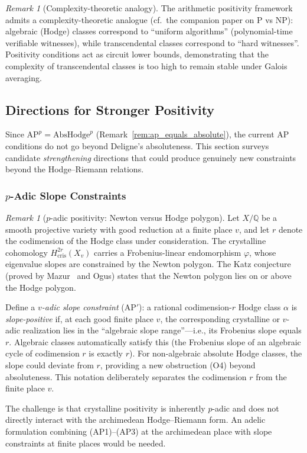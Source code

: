 \documentclass[aps,prd,twocolumn,superscriptaddress,nofootinbib]{revtex4-2}
\theoremstyle{definition}
\theoremstyle{remark}
\newtheorem{remark}[theorem]{Remark}
\begin{document}
\begin{remark}[Complexity-theoretic analogy]
\label{rem:pnp-analogy}
The arithmetic positivity framework admits a complexity-theoretic analogue (cf.\ the companion paper on $\mathrm{P}$ vs $\mathrm{NP}$): algebraic (Hodge) classes correspond to ``uniform algorithms'' (polynomial-time verifiable witnesses), while transcendental classes correspond to ``hard witnesses''. Positivity conditions act as circuit lower bounds, demonstrating that the complexity of transcendental classes is too high to remain stable under Galois averaging.
\end{remark}



\subsection{Directions for Stronger Positivity}
\label{sec:stronger_positivity}

Since $\mathrm{AP}^p = \mathrm{AbsHodge}^p$ (Remark~\ref{rem:ap_equals_absolute}), the current AP conditions do not go beyond Deligne's absoluteness. This section surveys candidate \textit{strengthening} directions that could produce genuinely new constraints beyond the Hodge--Riemann relations.

\subsubsection{\texorpdfstring{$p$-Adic Slope Constraints}{p-Adic Slope Constraints}}

\begin{remark}[$p$-adic positivity: Newton versus Hodge polygon]
\label{rem:newton-hodge}
Let $X/\mathbb{Q}$ be a smooth projective variety with good reduction at a finite place $v$, and let $r$ denote the codimension of the Hodge class under consideration. The crystalline cohomology $H^{2r}_{\mathrm{cris}}(X_v)$ carries a Frobenius-linear endomorphism $\varphi$, whose eigenvalue slopes are constrained by the Newton polygon. The Katz conjecture (proved by Mazur~\cite{Mazur1972} and Ogus) states that the Newton polygon lies on or above the Hodge polygon.

Define a \textit{$v$-adic slope constraint} (AP$'$): a rational codimension-$r$ Hodge class $\alpha$ is \textit{slope-positive} if, at each good finite place $v$, the corresponding crystalline or $v$-adic realization lies in the ``algebraic slope range''---i.e., its Frobenius slope equals $r$. Algebraic classes automatically satisfy this (the Frobenius slope of an algebraic cycle of codimension $r$ is exactly $r$). For non-algebraic absolute Hodge classes, the slope could deviate from $r$, providing a new obstruction (O4) beyond absoluteness. This notation deliberately separates the codimension $r$ from the finite place $v$.

The challenge is that crystalline positivity is inherently $p$-adic and does not directly interact with the archimedean Hodge--Riemann form. An adelic formulation combining (AP1)--(AP3) at the archimedean place with slope constraints at finite places would be needed.
\end{remark}
\end{document}
